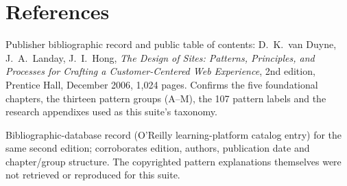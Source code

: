 %
\clearpage
\section*{References}
\begin{description}[leftmargin=3.2em,style=nextline]
  \item[{[B1]}] Publisher bibliographic record and public table of contents:
    D.~K.~van Duyne, J.~A.~Landay, J.~I.~Hong, \emph{The Design of Sites:
    Patterns, Principles, and Processes for Crafting a Customer-Centered Web
    Experience}, 2nd edition, Prentice Hall, December 2006, 1{,}024 pages.
    Confirms the five foundational chapters, the thirteen pattern groups
    (A--M), the 107 pattern labels and the research appendixes used as this
    suite's taxonomy.
  \item[{[B2]}] Bibliographic-database record (O'Reilly learning-platform
    catalog entry) for the same second edition; corroborates edition,
    authors, publication date and chapter/group structure. The copyrighted
    pattern explanations themselves were not retrieved or reproduced for
    this suite.
\end{description}

